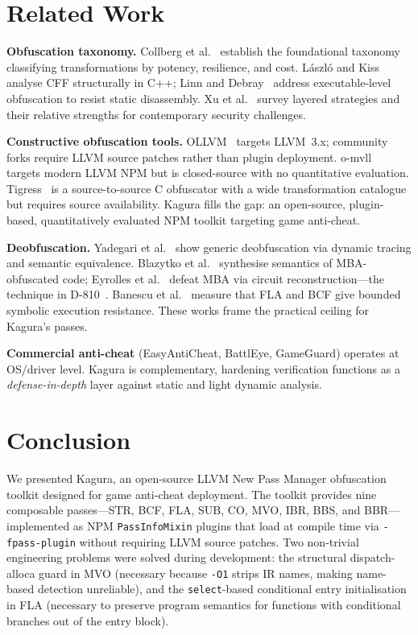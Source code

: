 \documentclass[conference]{IEEEtran}
\begin{document}
\section{Related Work}
\label{sec:related}

\textbf{Obfuscation taxonomy.}
Collberg et al.~\cite{collberg1997taxonomy} establish the foundational
taxonomy classifying transformations by potency, resilience, and cost.
L{\'a}szl{\'o} and Kiss~\cite{laszlo2009obfuscating} analyse CFF
structurally in C++; Linn and Debray~\cite{linn2003obfuscation} address
executable-level obfuscation to resist static disassembly.
Xu et al.~\cite{xu2017cifar} survey layered strategies and their
relative strengths for contemporary security challenges.

\textbf{Constructive obfuscation tools.}
OLLVM~\cite{junod2015obfuscator} targets LLVM~3.x; community forks
require LLVM source patches rather than plugin deployment.
o-mvll~\cite{quarkslab2022omvll} targets modern LLVM NPM but is
closed-source with no quantitative evaluation.
Tigress~\cite{collberg2012tigress} is a source-to-source C obfuscator
with a wide transformation catalogue but requires source availability.
Kagura fills the gap: an open-source, plugin-based, quantitatively
evaluated NPM toolkit targeting game anti-cheat.

\textbf{Deobfuscation.}
Yadegari et al.~\cite{yadegari2015generic} show generic deobfuscation
via dynamic tracing and semantic equivalence.
Blazytko et al.~\cite{blazytko2017syntia} synthesise semantics of
MBA-obfuscated code; Eyrolles et al.~\cite{eyrolles2017mixedbool}
defeat MBA via circuit reconstruction---the technique in D-810~\cite{liu2017d810}.
Banescu et al.~\cite{banescu2016code} measure that FLA and BCF give
bounded symbolic execution resistance.
These works frame the practical ceiling for Kagura's passes.

\textbf{Commercial anti-cheat} (EasyAntiCheat, BattlEye, GameGuard)
operates at OS/driver level.
Kagura is complementary, hardening verification functions as a
\emph{defense-in-depth} layer against static and light dynamic analysis.

\section{Conclusion}
\label{sec:conclusion}

We presented Kagura, an open-source LLVM New Pass Manager obfuscation
toolkit designed for game anti-cheat deployment.
The toolkit provides nine composable passes—STR, BCF, FLA, SUB, CO, MVO,
IBR, BBS, and BBR—implemented as NPM \texttt{PassInfoMixin} plugins that
load at compile time via \texttt{-fpass-plugin} without requiring LLVM
source patches.
Two non-trivial engineering problems were solved during development: the
structural dispatch-alloca guard in MVO (necessary because \texttt{-O1}
strips IR names, making name-based detection unreliable), and the
\texttt{select}-based conditional entry initialisation in FLA (necessary
to preserve program semantics for functions with conditional branches out
of the entry block).
\end{document}

